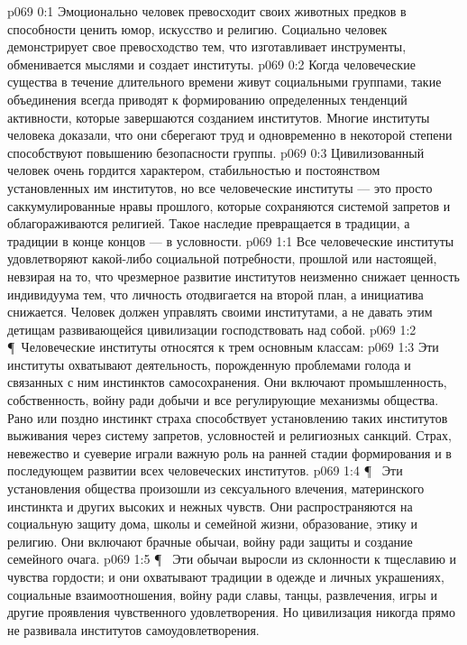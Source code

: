 \vs p069 0:1 Эмоционально человек превосходит своих животных предков в способности ценить юмор, искусство и религию. Социально человек демонстрирует свое превосходство тем, что изготавливает инструменты, обменивается мыслями и создает институты.
\vs p069 0:2 Когда человеческие существа в течение длительного времени живут социальными группами, такие объединения всегда приводят к формированию определенных тенденций активности, которые завершаются созданием институтов. Многие институты человека доказали, что они сберегают труд и одновременно в некоторой степени способствуют повышению безопасности группы.
\vs p069 0:3 Цивилизованный человек очень гордится характером, стабильностью и постоянством установленных им институтов, но все человеческие институты --- это просто саккумулированные нравы прошлого, которые сохраняются системой запретов и облагораживаются религией. Такое наследие превращается в традиции, а традиции в конце концов --- в условности.
\vs p069 1:1 Все человеческие институты удовлетворяют какой\hyp{}либо социальной потребности, прошлой или настоящей, невзирая на то, что чрезмерное развитие институтов неизменно снижает ценность индивидуума тем, что личность отодвигается на второй план, а инициатива снижается. Человек должен управлять своими институтами, а не давать этим детищам развивающейся цивилизации господствовать над собой.
\vs p069 1:2 \P\ Человеческие институты относятся к трем основным классам:
\vs p069 1:3 \bibnobreakspace {} Эти институты охватывают деятельность, порожденную проблемами голода и связанных с ним инстинктов самосохранения. Они включают промышленность, собственность, войну ради добычи и все регулирующие механизмы общества. Рано или поздно инстинкт страха способствует установлению таких институтов выживания через систему запретов, условностей и религиозных санкций. Страх, невежество и суеверие играли важную роль на ранней стадии формирования и в последующем развитии всех человеческих институтов.
\vs p069 1:4 \P\ \bibnobreakspace {} Эти установления общества произошли из сексуального влечения, материнского инстинкта и других высоких и нежных чувств. Они распространяются на социальную защиту дома, школы и семейной жизни, образование, этику и религию. Они включают брачные обычаи, войну ради защиты и создание семейного очага.
\vs p069 1:5 \P\ \bibnobreakspace {} Эти обычаи выросли из склонности к тщеславию и чувства гордости; и они охватывают традиции в одежде и личных украшениях, социальные взаимоотношения, войну ради славы, танцы, развлечения, игры и другие проявления чувственного удовлетворения. Но цивилизация никогда прямо не развивала институтов самоудовлетворения.
